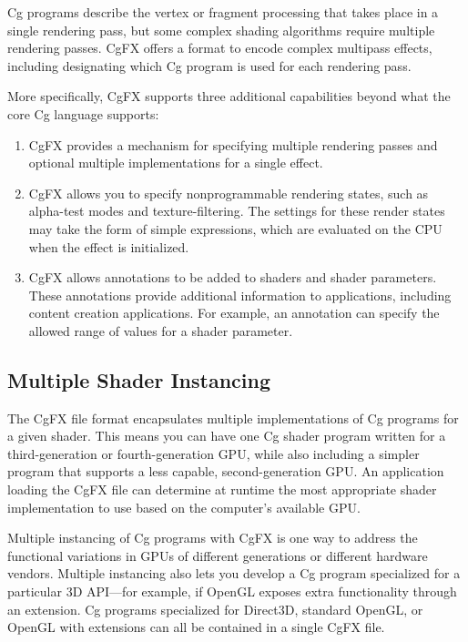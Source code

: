 \documentclass{book}
\begin{document}
Cg programs describe the vertex or fragment processing that takes place in a single rendering pass, but some complex shading algorithms require multiple rendering passes. CgFX offers a format to encode complex multipass effects, including designating which Cg program is used for each rendering pass.

More specifically, CgFX supports three additional capabilities beyond what the core Cg language supports:

\FloatBarrier
\begin{enumerate}
\item CgFX provides a mechanism for specifying multiple rendering passes and optional multiple implementations for a single effect.
\item CgFX allows you to specify nonprogrammable rendering states, such as alpha-test modes and texture-filtering. The settings for these render states may take the form of simple expressions, which are evaluated on the CPU when the effect is initialized.
\item CgFX allows annotations to be added to shaders and shader parameters. These annotations provide additional information to applications, including content creation applications. For example, an annotation can specify the allowed range of values for a shader parameter.
\end{enumerate}
\FloatBarrier

\subsection*{Multiple Shader Instancing}

The CgFX file format encapsulates multiple implementations of Cg programs for a given shader. This means you can have one Cg shader program written for a third-generation or fourth-generation GPU, while also including a simpler program that supports a less capable, second-generation GPU. An application loading the CgFX file can determine at runtime the most appropriate shader implementation to use based on the computer's available GPU.

Multiple instancing of Cg programs with CgFX is one way to address the functional variations in GPUs of different generations or different hardware vendors. Multiple instancing also lets you develop a Cg program specialized for a particular 3D API—for example, if OpenGL exposes extra functionality through an extension. Cg programs specialized for Direct3D, standard OpenGL, or OpenGL with extensions can all be contained in a single CgFX file.
\end{document}
